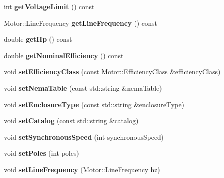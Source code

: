 \begin{DoxyCompactItemize}
int {\bfseries get\+Voltage\+Limit} () const
\item 
\mbox{\label{class_motor_data_a59db7b008daf788c7a6a186dcd49a46f}} 
Motor\+::\+Line\+Frequency {\bfseries get\+Line\+Frequency} () const
\item 
\mbox{\label{class_motor_data_a1a5e37e438f506d11326e70b6fb261b8}} 
double {\bfseries get\+Hp} () const
\item 
\mbox{\label{class_motor_data_a79aed11954e7f104446c43ad29178fa7}} 
double {\bfseries get\+Nominal\+Efficiency} () const
\item 
\mbox{\label{class_motor_data_aeb37e8295eeee82f0c5f9cd04043d7b7}} 
void {\bfseries set\+Efficiency\+Class} (const Motor\+::\+Efficiency\+Class \&efficiency\+Class)
\item 
\mbox{\label{class_motor_data_a51e4f837a2b97baf1aff49efb21ab7ff}} 
void {\bfseries set\+Nema\+Table} (const std\+::string \&nema\+Table)
\item 
\mbox{\label{class_motor_data_a7a6a1b8600a9c7481b32bf962edcef99}} 
void {\bfseries set\+Enclosure\+Type} (const std\+::string \&enclosure\+Type)
\item 
\mbox{\label{class_motor_data_ac7e264252a15a63a2fd35cbb114478e6}} 
void {\bfseries set\+Catalog} (const std\+::string \&catalog)
\item 
\mbox{\label{class_motor_data_ade2574702a50e2be835c5204ead50479}} 
void {\bfseries set\+Synchronous\+Speed} (int synchronous\+Speed)
\item 
\mbox{\label{class_motor_data_a62f02ca68370ee2a7182671eb035dbe2}} 
void {\bfseries set\+Poles} (int poles)
\item 
\mbox{\label{class_motor_data_ae7e4126c99e06bf519040f6641a49b85}} 
void {\bfseries set\+Line\+Frequency} (Motor\+::\+Line\+Frequency hz)
\item 
\mbox{\label{class_motor_data_a7be5a2f208a11a3955d4cb2e0b122901}} 

\end{DoxyCompactItemize}
